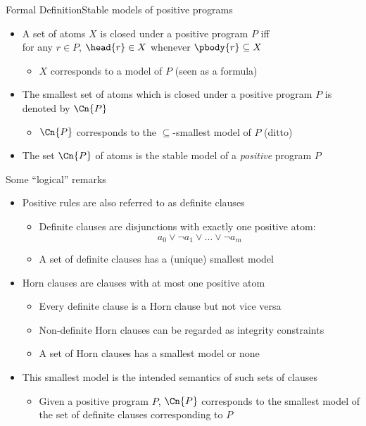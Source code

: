 \begin{frame}[c]{Formal Definition}{Stable models of positive programs}
  \begin{itemize}
  \item<2-> A set of atoms $X$ is \alert{closed under} a positive program $P$ iff
    \\for any $r\in P$, $\head{r}\in X$ whenever $\pbody{r}\subseteq X$
    \begin{itemize}
    \item $X$ corresponds to a model of $P$ (seen as a formula)
    \end{itemize}
    \medskip
  \item<3-> The \alert{smallest} set of atoms which is closed under a positive
    program $P$ is denoted by $\Cn{P}$
    \begin{itemize}
    \item $\Cn{P}$ corresponds to the $\subseteq$-smallest model of $P$ (ditto)
    \end{itemize}
    \medskip
  \item<4-> The set $\Cn{P}$ of atoms is the \alert{stable model} of a \emph{positive} program $P$
  \end{itemize}
\end{frame}
\begin{frame}{Some ``logical'' remarks}
  \begin{itemize}
  \item <1-> Positive rules are also referred to as \alert<1-2>{definite clauses}
    \begin{itemize}
    \item Definite clauses are disjunctions with \alert<1>{exactly one} positive atom:
      \[
      a_0\vee\neg a_1\vee\dots\vee\neg a_m
      \]
    \item A set of definite clauses has a (unique) \alert<3>{smallest model}
    \end{itemize}
    \medskip
  \item<2-> \alert<2>{Horn clauses} are clauses with \alert<2>{at most} one positive atom
    \begin{itemize}
    \item Every definite clause is a Horn clause but not vice versa
    \item Non-definite Horn clauses can be regarded as integrity constraints
      \smallskip
    \item A set of Horn clauses has a \alert<3>{smallest model} or none
    \end{itemize}
    \medskip
  \item<3-> This \alert<3>{smallest model} is the intended semantics of such sets of clauses
    \begin{itemize}
    \item Given a positive program $P$,
    $\Cn{P}$ corresponds to the smallest model of the set of
    definite clauses corresponding to $P$
  \end{itemize}
\end{itemize}
\end{frame}
